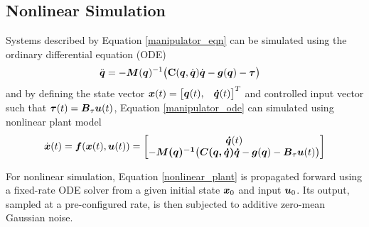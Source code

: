 \subsection{Nonlinear Simulation}
Systems described by Equation \eqref{manipulator_eqn} can be simulated using the ordinary differential equation (ODE)
\begin{equation}
\label{manipulator_ode}
\begin{aligned}
	\ddot{\vb*{q}} &= -\vb*{M}(\vb*{q})^{-1}\big{(}\vb{C}(\vb*{q}, \dot{\vb*{q}})\dot{\vb*{q}} - \vb*{g}(\vb*{q}) - \vb*{\tau}\big{)}
\end{aligned}
\end{equation}
and by defining the state vector $\vb*{x}(t) = \begin{bmatrix} \vb*{q}(t), & \vb*{\dot{q}}(t) \end{bmatrix}^{T}$ and controlled input vector such that $\vb*{\tau}(t) = \vb*{B}_{\tau}\vb*{u}(t)$, Equation \eqref{manipulator_ode} can simulated using nonlinear plant model
\begin{equation}
\label{nonlinear_plant}
\begin{aligned}
	\dot{\vb*{x}}(t) = \vb*{f}(\vb*{x}(t), \vb*{u}(t)) =
	\begin{bmatrix}
		\vb*{\dot{q}}(t)\\
		-\vb*{M(q)^{-1}\big{(} C(q, \dot{q})\dot{q}} - \vb*{g}(\vb*{q}) - \vb*{B}_{\tau}\vb*{u}(t) \big{)}\\
	\end{bmatrix}
\end{aligned}
\end{equation}

For nonlinear simulation, Equation \eqref{nonlinear_plant} is propagated forward using a fixed-rate ODE solver from a given initial state $\vb*{x}_{0}$ and input $\vb*{u}_{0}$.  Its output, sampled at a pre-configured rate, is then subjected to additive zero-mean Gaussian noise.

